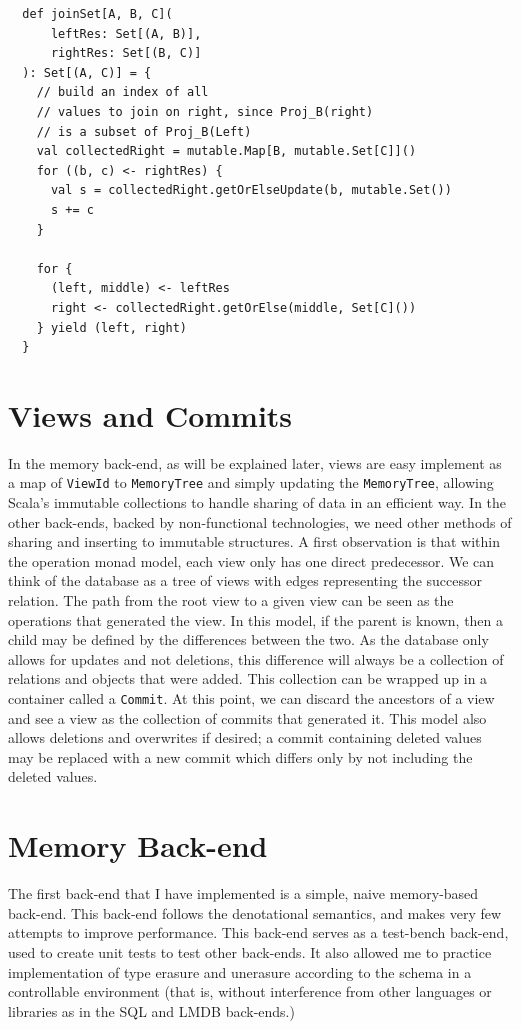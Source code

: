 \documentclass[12pt,a4paper,twoside,openright]{report}
\newcommand\codeName[1]{\texttt{#1}}
\renewcommand{\baselinestretch}{1.1}    %
\begin{document}
\renewcommand{\baselinestretch}{0.8}
\begin{framed}
\begin{verbatim}
  def joinSet[A, B, C](
      leftRes: Set[(A, B)],
      rightRes: Set[(B, C)]
  ): Set[(A, C)] = {
    // build an index of all 
    // values to join on right, since Proj_B(right)
    // is a subset of Proj_B(Left)
    val collectedRight = mutable.Map[B, mutable.Set[C]]()
    for ((b, c) <- rightRes) {
      val s = collectedRight.getOrElseUpdate(b, mutable.Set())
      s += c
    }
    
    for {
      (left, middle) <- leftRes
      right <- collectedRight.getOrElse(middle, Set[C]())
    } yield (left, right)
  }
\end{verbatim}
\end{framed}
\renewcommand{\baselinestretch}{1.1}

\section{Views and Commits}
In the memory back-end, as will be explained later, views are easy implement as a map of \codeName{ViewId} to \codeName{MemoryTree} and simply updating the \codeName{MemoryTree}, allowing Scala's immutable collections to handle sharing of data in an efficient way. In the other back-ends, backed by non-functional technologies, we need other methods of sharing and inserting to immutable structures. A first observation is that within the operation monad model, each view only has one direct predecessor. We can think of the database as a tree of views with edges representing the successor relation. The path from the root view to a given view can be seen as the operations that generated the view. In this model, if the parent is known, then a child may be defined by the differences between the two. As the database only allows for updates and not deletions, this difference will always be a collection of relations and objects that were added. This collection can be wrapped up in a container called a \codeName{Commit}. At this point, we can discard the ancestors of a view and see a view as the collection of commits that generated it. This model also allows deletions and overwrites if desired; a commit containing deleted values may be replaced with a new commit which differs only by not including the deleted values.

\section{Memory Back-end}
The first back-end that I have implemented is a simple, naive memory-based back-end. This back-end follows the denotational semantics, and makes very few attempts to improve performance. This back-end serves as a test-bench back-end, used to create unit tests to test other back-ends. It also allowed me to practice implementation of type erasure and unerasure according to the schema in a controllable environment (that is, without interference from other languages or libraries as in the SQL and LMDB back-ends.)
\end{document}
